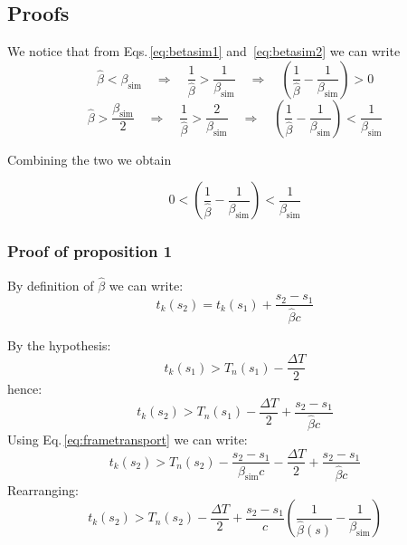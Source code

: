 \subsection{Proofs}
\label{seq:coasting_proofs}


We notice that from Eqs.\,\ref{eq:betasim1} and~\ref{eq:betasim2} we can write
\begin{equation}
\hat{\beta} < \beta_\text{sim} 
\quad \Rightarrow \quad
\frac{1}{\hat{\beta}} > \frac{1}{\beta_\text{sim}}
\quad \Rightarrow \quad
\left(
\frac{1}{\hat{\beta}} - \frac{1}{\beta_\text{sim}}
\right) > 0
\end{equation}
\begin{equation}
\hat{\beta} > \frac{\beta_\text{sim}}{2} 
\quad \Rightarrow \quad
\frac{1}{\hat{\beta}} > \frac{2}{\beta_\text{sim}}
\quad \Rightarrow \quad
\left(
\frac{1}{\hat{\beta}} - \frac{1}{\beta_\text{sim}}
\right) < \frac{1}{\beta_\text{sim}}
\end{equation}

Combining the two we obtain

\begin{equation}
0<\left(
\frac{1}{\hat{\beta}} - \frac{1}{\beta_\text{sim}}
\right) < \frac{1}{\beta_\text{sim}}
\label{eq:betaineq}
\end{equation}

\subsubsection*{Proof of proposition 1}
By definition of $\hat{\beta}$ we can write:
\begin{equation}
t_k(s_2) = t_k(s_1) + \frac{s_2 - s_1}{\hat{\beta} c} 
\label{eq:tk2fromtk1}
\end{equation}

By the hypothesis:
\begin{equation}
t_k(s_1) > T_n(s_1) - \frac{\Delta T}{2}
\end{equation}
hence:
\begin{equation}
t_k(s_2) > T_n(s_1) - \frac{\Delta T}{2} + \frac{s_2 - s_1}{\hat{\beta} c} 
\end{equation}
Using Eq.\,\ref{eq:frametransport} we can write:
\begin{equation}
t_k(s_2) > T_n(s_2) - \frac{s_2 - s_1}{{\beta}_\text{sim} c}  - \frac{\Delta T}{2} + \frac{s_2 - s_1}{\hat{\beta} c} 
\end{equation}
Rearranging:
\begin{equation}
t_k(s_2) > T_n(s_2) - \frac{\Delta T}{2} + \frac{s_2 - s_1}{c} \left(
\frac{1}{\hat{\beta}(s)} - \frac{1}{\beta_\text{sim}}
\right)
\end{equation}

